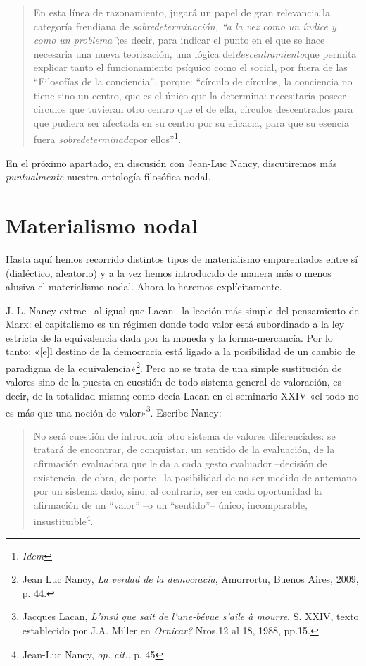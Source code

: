 \begin{quote}
En esta línea de razonamiento, jugará un papel de gran relevancia la categoría freudiana de \emph{sobredeterminación, ``a la vez como un índice y como un problema''};es decir, para indicar el punto en el que se hace necesaria una nueva teorización, una lógica del\emph{descentramiento}que permita explicar tanto el funcionamiento psíquico como el social, por fuera de las ``Filosofías de la conciencia'', porque: ``círculo de círculos, la conciencia no tiene sino un centro, que es el único que la determina: necesitaría poseer círculos que tuvieran otro centro que el de ella, círculos descentrados para que pudiera ser afectada en su centro por su eficacia, para que su esencia fuera \emph{sobredeterminada}por ellos''\footnote{\emph{Idem}}.
\end{quote}

En el próximo apartado, en discusión con Jean-Luc Nancy, discutiremos más \emph{puntualmente} nuestra ontología filosófica nodal.

\section{Materialismo nodal}

Hasta aquí hemos recorrido distintos tipos de materialismo emparentados entre sí (dialéctico, aleatorio) y a la vez hemos introducido de manera más o menos alusiva el materialismo nodal. Ahora lo haremos explícitamente.

J.-L. Nancy extrae --al igual que Lacan-- la lección más simple del pensamiento de Marx: el capitalismo es un régimen donde todo valor está subordinado a la ley estricta de la equivalencia dada por la moneda y la forma-mercancía. Por lo tanto: «{[}e{]}l destino de la democracia está ligado a la posibilidad de un cambio de paradigma de la equivalencia»\footnote{Jean Luc Nancy, \emph{La verdad de la democracia}, Amorrortu, Buenos Aires, 2009, p. 44.}. Pero no se trata de una simple sustitución de valores sino de la puesta en cuestión de todo sistema general de valoración, es decir, de la totalidad misma; como decía Lacan en el seminario XXIV «el todo no es más que una noción de valor»\footnote{Jacques Lacan, \emph{L'insú que sait de l'une-bévue s'aile à mourre}, S. XXIV, texto establecido por J.A. Miller en \emph{Ornicar?} Nros.12 al 18, 1988, pp.15.}. Escribe Nancy:

\begin{quote}
No será cuestión de introducir otro sistema de valores diferenciales: se tratará de encontrar, de conquistar, un sentido de la evaluación, de la afirmación evaluadora que le da a cada gesto evaluador --decisión de existencia, de obra, de porte-- la posibilidad de no ser medido de antemano por un sistema dado, sino, al contrario, ser en cada oportunidad la afirmación de un ``valor'' --o un ``sentido''-- único, incomparable, insustituible\footnote{Jean-Luc Nancy, \emph{op. cit.}, p. 45}.
\end{quote}


